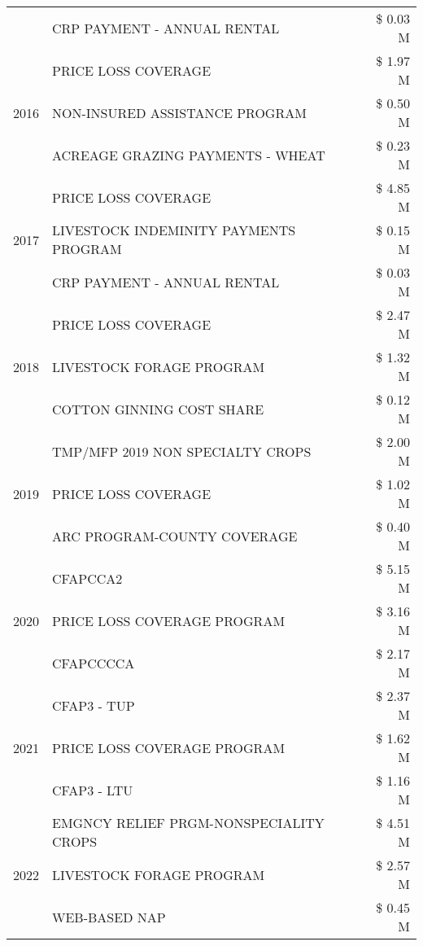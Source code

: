 \begin{tabular}{llr}
 & CRP PAYMENT - ANNUAL RENTAL & \$ 0.03 M \\
\cline{1-3}
\multirow[t]{3}{*}{2016} & PRICE LOSS COVERAGE & \$ 1.97 M \\
 & NON-INSURED ASSISTANCE PROGRAM & \$ 0.50 M \\
 & ACREAGE GRAZING PAYMENTS - WHEAT & \$ 0.23 M \\
\cline{1-3}
\multirow[t]{3}{*}{2017} & PRICE LOSS COVERAGE & \$ 4.85 M \\
 & LIVESTOCK INDEMINITY PAYMENTS PROGRAM & \$ 0.15 M \\
 & CRP PAYMENT - ANNUAL RENTAL & \$ 0.03 M \\
\cline{1-3}
\multirow[t]{3}{*}{2018} & PRICE LOSS COVERAGE & \$ 2.47 M \\
 & LIVESTOCK FORAGE PROGRAM & \$ 1.32 M \\
 & COTTON GINNING COST SHARE & \$ 0.12 M \\
\cline{1-3}
\multirow[t]{3}{*}{2019} & TMP/MFP 2019 NON SPECIALTY CROPS & \$ 2.00 M \\
 & PRICE LOSS COVERAGE & \$ 1.02 M \\
 & ARC PROGRAM-COUNTY COVERAGE & \$ 0.40 M \\
\cline{1-3}
\multirow[t]{3}{*}{2020} & CFAPCCA2 & \$ 5.15 M \\
 & PRICE LOSS COVERAGE PROGRAM & \$ 3.16 M \\
 & CFAPCCCCA & \$ 2.17 M \\
\cline{1-3}
\multirow[t]{3}{*}{2021} & CFAP3 - TUP & \$ 2.37 M \\
 & PRICE LOSS COVERAGE PROGRAM & \$ 1.62 M \\
 & CFAP3 - LTU & \$ 1.16 M \\
\cline{1-3}
\multirow[t]{3}{*}{2022} & EMGNCY RELIEF PRGM-NONSPECIALITY CROPS & \$ 4.51 M \\
 & LIVESTOCK FORAGE PROGRAM & \$ 2.57 M \\
 & WEB-BASED NAP & \$ 0.45 M \\
\cline{1-3}
\bottomrule
\end{tabular}
